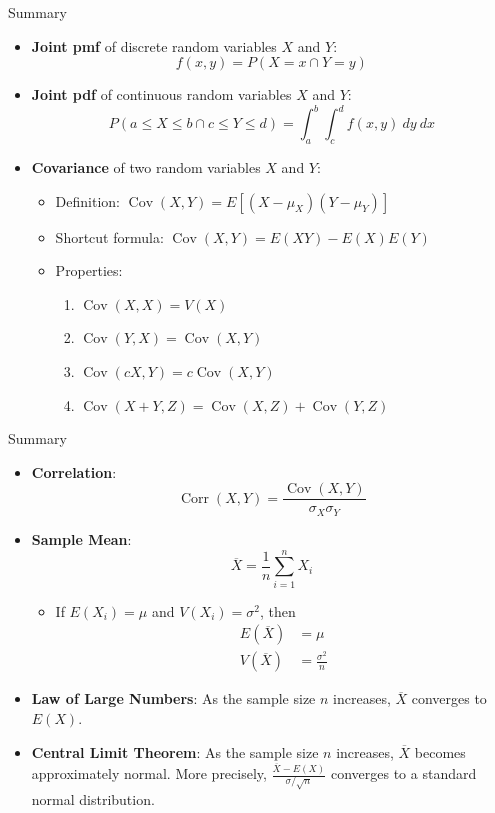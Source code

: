 \documentclass[xcolor=table]{beamer}
\DeclareMathOperator{\Cov}{Cov}
\DeclareMathOperator{\Corr}{Corr}
\begin{document}
\begin{frame}{Summary}
\begin{itemize}
\item \textbf{Joint pmf} of discrete random variables $X$ and $Y$: $$f(x,y)=P(X=x \cap Y=y)$$
\item \textbf{Joint pdf} of continuous random variables $X$ and $Y$: 
$$P(a \leq X \leq b \cap c \leq Y \leq d)=\int_{a}^b\int_{c}^d f(x,y)\ dy\ dx$$
\item \textbf{Covariance} of two random variables $X$ and $Y$:
\begin{itemize}
\item Definition: $\Cov(X,Y) = E[(X-\mu_X)(Y-\mu_Y)]$
\vspace{.08in}
\item Shortcut formula: $\Cov(X,Y)=E(XY)-E(X)E(Y)$
\item Properties:
\begin{enumerate}
\item $\Cov(X,X) = V(X)$
\item $\Cov(Y,X) = \Cov(X,Y)$
\item $\Cov(cX,Y) = c\Cov(X,Y)$
\item $\Cov(X+Y,Z) = \Cov(X,Z)+\Cov(Y,Z)$
\end{enumerate}
\end{itemize}
\end{itemize}
\end{frame}

\begin{frame}{Summary}

\begin{itemize}
\item \textbf{Correlation}: $$\Corr(X,Y)=\frac{\Cov(X,Y)}{\sigma_X\sigma_Y}$$
\item \textbf{Sample Mean}: $$\overline X = \frac1n\sum_{i=1}^n X_i$$
\begin{itemize}
\item If $E(X_i)=\mu$ and $V(X_i)=\sigma^2$, then 
\begin{align*}
E(\overline X)&=\mu\\
V(\overline X)&=\frac{\sigma^2}n
\end{align*}
\end{itemize}
\item \textbf{Law of Large Numbers}: As the sample size $n$ increases, $\overline{X}$ converges to $E(X)$.
\item \textbf{Central Limit Theorem}: As the sample size $n$ increases, $\overline X$ becomes approximately normal. More precisely, $\frac{\overline{X}-E(X)}{\sigma/\sqrt{n}}$ converges to a standard normal distribution.
\end{itemize}
\end{frame}
\end{document}

